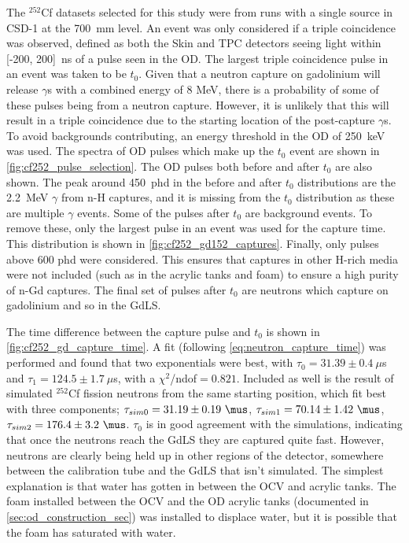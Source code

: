 \par
The ${}^{252}$Cf datasets selected for this study were from runs with a single source in CSD-1 at the 700~mm level.
An event was only considered if a triple coincidence was observed, defined as both the Skin and TPC detectors seeing light within [-200, 200]~ns of a pulse seen in the OD.
The largest triple coincidence pulse in an event was taken to be $t_0$.
Given that a neutron capture on gadolinium will release $\gamma$s with a combined energy of 8 MeV, there is a probability of some of these pulses being from a neutron capture.
However, it is unlikely that this will result in a triple coincidence due to the starting location of the post-capture $\gamma$s.
To avoid backgrounds contributing, an energy threshold in the OD of 250~keV was used.
The spectra of OD pulses which make up the $t_0$ event are shown in \autoref{fig:cf252_pulse_selection}.
The OD pulses both before and after $t_0$ are also shown.
The peak around 450~phd in the before and after $t_0$ distributions are the 2.2~MeV $\gamma$ from n-H captures, and it is missing from the $t_0$ distribution as these are multiple $\gamma$ events.
Some of the pulses after $t_0$ are background events.
To remove these, only the largest pulse in an event was used for the capture time.
This distribution is shown in \autoref{fig:cf252_gd152_captures}.
Finally, only pulses above 600 phd were considered.
This ensures that captures in other H-rich media were not included (such as in the acrylic tanks and foam) to ensure a high purity of n-Gd captures.
The final set of pulses after $t_0$ are neutrons which capture on gadolinium and so in the GdLS.





\par
The time difference between the capture pulse and $t_0$ is shown in \autoref{fig:cf252_gd_capture_time}.
A fit (following \autoref{eq:neutron_capture_time}) was performed and found that two exponentials were best, with $\tau_0 = 31.39 \pm 0.4~\mu$s and $\tau_1 = 124.5 \pm 1.7~\mu$s, with a $\chi^2$/ndof$=0.821$.
Included as well is the result of simulated ${}^{252}$Cf fission neutrons from the same starting position, which fit best with three components; $\tau_{sim0} = 31.19\pm0.19~\mus$, $\tau_{sim1} = 70.14\pm1.42~\mus$, $\tau_{sim2} = 176.4\pm3.2~\mus$.
$\tau_0$ is in good agreement with the simulations, indicating that once the neutrons reach the GdLS they are captured quite fast.
However, neutrons are clearly being held up in other regions of the detector, somewhere between the calibration tube and the GdLS that isn't simulated.
The simplest explanation is that water has gotten in between the OCV and acrylic tanks.
The foam installed between the OCV and the OD acrylic tanks (documented in \autoref{sec:od_construction_sec}) was installed to displace water, but it is possible that the foam has saturated with water.

